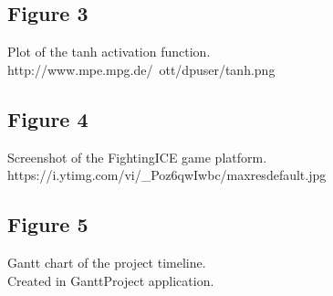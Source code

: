 \documentclass[11pt,a4paper]{article}
\begin{document}
\subsection*{Figure 3}
Plot of the tanh activation function.\\
http://www.mpe.mpg.de/~ott/dpuser/tanh.png
\subsection*{Figure 4}
Screenshot of the FightingICE game platform.\\
https://i.ytimg.com/vi/\_Poz6qwIwbc/maxresdefault.jpg
\subsection*{Figure 5}
Gantt chart of the project timeline.\\
Created in GanttProject application.
\newpage
\end{document}
